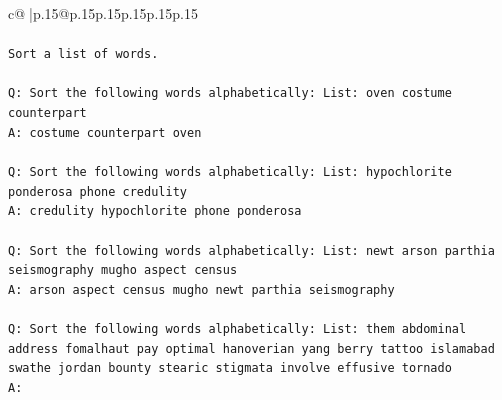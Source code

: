 \documentclass{article}
\begin{document}
{\begin{supertabular}{c@{$\;$}|p{.15\linewidth}@{}p{.15\linewidth}p{.15\linewidth}p{.15\linewidth}p{.15\linewidth}p{.15\linewidth}}
{{{\\ 
\\ 
\texttt{Sort a list of words.} \\
\\ 
\texttt{Q: Sort the following words alphabetically: List: oven costume counterpart} \\
\texttt{A: costume counterpart oven} \\
\\ 
\texttt{Q: Sort the following words alphabetically: List: hypochlorite ponderosa phone credulity} \\
\texttt{A: credulity hypochlorite phone ponderosa} \\
\\ 
\texttt{Q: Sort the following words alphabetically: List: newt arson parthia seismography mugho aspect census} \\
\texttt{A: arson aspect census mugho newt parthia seismography} \\
\\ 
\texttt{Q: Sort the following words alphabetically: List: them abdominal address fomalhaut pay optimal hanoverian yang berry tattoo islamabad swathe jordan bounty stearic stigmata involve effusive tornado} \\
\texttt{A:} \\
            }
        }
    }
     \\ \\


\end{supertabular}}
\end{document}
